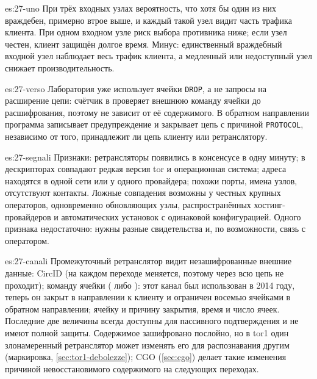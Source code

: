 \begin{soluzione}{es:27-uno}
При трёх входных узлах вероятность, что хотя бы один из них враждебен, примерно втрое выше, и каждый такой узел видит часть трафика клиента. При одном входном узле риск выбора противника ниже; если узел честен, клиент защищён долгое время. Минус: единственный враждебный входной узел наблюдает весь трафик клиента, а медленный или недоступный узел снижает производительность.
\end{soluzione}

\begin{soluzione}{es:27-verso}
Лаборатория уже использует ячейки \texttt{DROP}, а не запросы на расширение цепи: счётчик в  проверяет внешнюю команду ячейки до расшифрования, поэтому не зависит от её содержимого. В обратном направлении программа записывает предупреждение и закрывает цепь с причиной \texttt{PROTOCOL}, независимо от того, принадлежит ли цепь клиенту или ретранслятору.
\end{soluzione}

\begin{soluzione}{es:27-segnali}
Признаки: ретрансляторы появились в консенсусе в одну минуту; в дескрипторах совпадают редкая версия tor и операционная система; адреса находятся в одной сети или у одного провайдера; похожи порты, имена узлов, отсутствуют контакты. Ложные совпадения возможны у честных крупных операторов, одновременно обновляющих узлы, распространённых хостинг-провайдеров и автоматических установок с одинаковой конфигурацией. Одного признака недостаточно: нужны разные свидетельства и, по возможности, связь с оператором.
\end{soluzione}

\begin{soluzione}{es:27-canali}
Промежуточный ретранслятор видит незашифрованные внешние данные: CircID (на каждом переходе меняется, поэтому через всю цепь не проходит); команду ячейки ( либо ): этот канал был использован в 2014 году, теперь он закрыт в направлении к клиенту и ограничен восемью ячейками в обратном направлении; ячейку  и причину закрытия, время и число ячеек. Последние две величины всегда доступны для пассивного подтверждения и не имеют полной защиты. Содержимое зашифровано послойно, но в tor1 один злонамеренный ретранслятор может изменять его для распознавания другим (маркировка, \cref{sec:tor1-debolezze}); CGO (\cref{sec:cgo}) делает такие изменения причиной невосстановимого содержимого на следующих переходах.
\end{soluzione}
